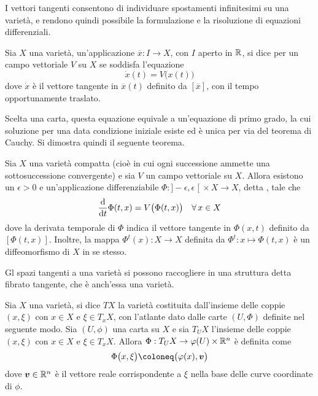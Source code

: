 I vettori tangenti consentono di individuare spostamenti infinitesimi su una varietà, e rendono quindi possibile la formulazione e la risoluzione di equazioni differenziali.

\begin{definition}
  Sia $X$ una varietà, un'applicazione $\overline{x}:I \to X$, con $I$ aperto in $\mathbb{R}$, si dice  per un campo vettoriale $V$ su $X$ se soddisfa l'equazione \begin{equation}
  \dot{x}(t) = V\big(x(t)\big)
  \end{equation} 
  dove $\dot{x}$ è il vettore tangente in $\overline{x}(t)$ definito da $[\overline{x}]$, con il tempo opportunamente traslato.
\end{definition}
\begin{remark}
  Scelta una carta, questa equazione equivale a un'equazione di primo grado, la cui soluzione per una data condizione iniziale esiste ed è unica per via del teorema di Cauchy. Si dimostra quindi il seguente teorema.
\end{remark}
\begin{theorem}
  Sia $X$ una varietà compatta (cioè in cui ogni successione ammette una sottosuccessione convergente) e sia $V$ un campo vettoriale su $X$. Allora esistono un $\epsilon > 0$ e un'applicazione differenziabile $\Phi:]-\epsilon, \epsilon\;[\ \times X \to X$, detta , tale che \begin{equation}
  \dv{t} \Phi(t,x) = V\big( \Phi(t,x)\big) \quad \forall\, x \in  X
  \end{equation} 
  dove la derivata temporale di $\Phi$ indica il vettore tangente in $\Phi(x,t)$ definito da $[\Phi(t,x)]$. Inoltre, la mappa $\Phi^t(x):X \to X$ definita da $\Phi^t:x \mapsto \Phi(t,x)$ è un diffeomorfismo di $X$ in se stesso.
\end{theorem}

Gl spazi tangenti a una varietà si possono raccogliere in una struttura detta fibrato tangente, che è anch'essa una varietà.

\begin{definition} \label{def:tanBundle}
  Sia $X$ una varietà, si dice  $TX$ la varietà costituita dall'insieme delle coppie $(x,\xi)$ con $x \in X$ e $\xi \in T_x X$, con l'atlante dato dalle carte $(U, \Phi)$ definite nel seguente modo. Sia $(U, \phi)$ una carta su $X$ e sia $T_U X$ l'insieme delle coppie $(x,\xi)$ con $x \in X$ e $\xi \in T_x X$. Allora $\Phi:T_U X \to \varphi(U) \times \mathbb{R}^{n}$ è definita come \begin{equation}
  \Phi \big(x,\xi\big) \defeq \big(\phi(x), \vec{v}\big)
  \end{equation} 
  dove $\boldsymbol{v} \in \mathbb{R}^{n}$ è il vettore reale corrispondente a $\xi$ nella base delle curve coordinate di $\phi$.
\end{definition}

